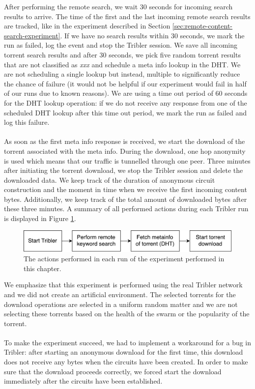 After performing the remote search, we wait 30 seconds for incoming search results to arrive. The time of the first and the last incoming remote search results are tracked, like in the experiment described in Section \ref{sec:remote-content-search-experiment}. If we have no search results within 30 seconds, we mark the run as failed, log the event and stop the Tribler session. We save all incoming torrent search results and after 30 seconds, we pick five random torrent results that are not classified as \emph{xxx} and schedule a meta info lookup in the DHT. We are not scheduling a single lookup but instead, multiple to significantly reduce the chance of failure (it would not be helpful if our experiment would fail in half of our runs due to known reasons). We are using a time out period of 60 seconds for the DHT lookup operation: if we do not receive any response from one of the scheduled DHT lookup after this time out period, we mark the run as failed and log this failure.\\\\
As soon as the first meta info response is received, we start the download of the torrent associated with the meta info. During the download, one hop anonymity is used which means that our traffic is tunnelled through one peer. Three minutes after initiating the torrent download, we stop the Tribler session and delete the downloaded data. We keep track of the duration of anonymous circuit construction and the moment in time when we receive the first incoming content bytes. Additionally, we keep track of the total amount of downloaded bytes after these three minutes. A summary of all performed actions during each Tribler run is displayed in Figure \ref{fig:big-experiment-setup}.\\

\begin{figure}[!h]
	\centering
	\includegraphics[width=0.7\columnwidth]{images/big_experiment/big_experiment_setup}
	\caption{The actions performed in each run of the experiment performed in this chapter.}
	\label{fig:big-experiment-setup}
\end{figure}

\noindent We emphasize that this experiment is performed using the real Tribler network and we did not create an artificial environment. The selected torrents for the  download operations are selected in a uniform random matter and we are not selecting these torrents based on the health of the swarm or the popularity of the torrent.\\\\
To make the experiment succeed, we had to implement a workaround for a bug in Tribler: after starting an anonymous download for the first time, this download does not receive any bytes when the circuits have been created. In order to make sure that the download proceeds correctly, we forced start the download immediately after the circuits have been established.

